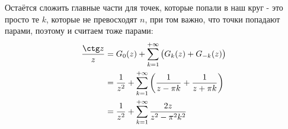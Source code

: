 Остаётся сложить главные части для точек, которые попали в наш круг - это просто те $k$, которые не превосходят $n$, при том важно, что точки попадают парами, поэтому и считаем тоже парами:
\begin{align*}
    \frac{\ctg z}{z} &= G_0(z) + \sum\limits_{k=1}^{+\infty} \left( G_k(z) + G_{-k}(z)\right) \\ 
    &= \frac{1}{z^2} + \sum\limits_{k=1}^{+\infty} \left( \frac{1}{z - \pi k} + \frac{1}{z + \pi k} \right) \\ 
    &= \frac{1}{z^2} + \sum\limits_{k=1}^{+\infty} \frac{2z}{z^2-\pi^2k^2}
\end{align*}

\newpage

